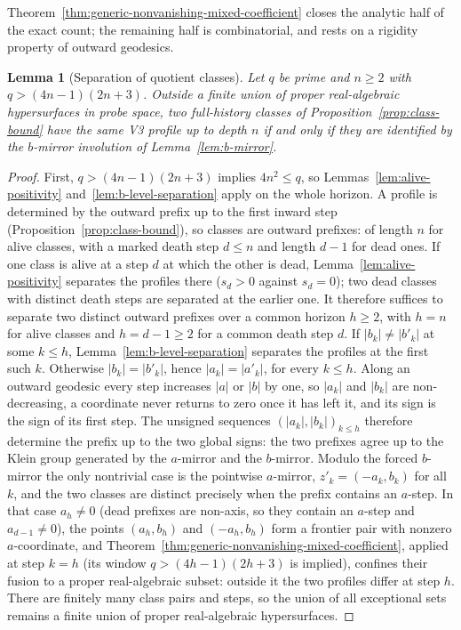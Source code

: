 \documentclass[11pt]{article}
\newtheorem{lemma}{Lemma}
\begin{document}
Theorem~\ref{thm:generic-nonvanishing-mixed-coefficient} closes the analytic half of the exact count; the
remaining half is combinatorial, and rests on a rigidity property of outward geodesics.

\begin{lemma}[Separation of quotient classes]
\label{lem:v3-quotient-class-separation}
Let $q$ be prime and $n\ge2$ with $q>(4n-1)(2n+3)$.
Outside a finite union of proper real-algebraic hypersurfaces in probe space, two full-history classes of
Proposition~\ref{prop:class-bound} have the same V3 profile up to depth $n$ if and only if they are
identified by the $b$-mirror involution of Lemma~\ref{lem:b-mirror}.
\end{lemma}

\begin{proof}
First, $q>(4n-1)(2n+3)$ implies $4n^2\le q$, so Lemmas~\ref{lem:alive-positivity}
and~\ref{lem:b-level-separation} apply on the whole horizon.
A profile is determined by the outward prefix up to the first inward step
(Proposition~\ref{prop:class-bound}), so classes are outward prefixes: of length $n$ for alive classes,
with a marked death step $d\le n$ and length $d-1$ for dead ones.
If one class is alive at a step $d$ at which the other is dead, Lemma~\ref{lem:alive-positivity} separates
the profiles there ($s_d>0$ against $s_d=0$); two dead classes with distinct death steps are separated at
the earlier one.
It therefore suffices to separate two distinct outward prefixes over a common horizon $h\ge2$, with $h=n$
for alive classes and $h=d-1\ge2$ for a common death step $d$.
If $|b_k|\neq|b'_k|$ at some $k\le h$, Lemma~\ref{lem:b-level-separation} separates the profiles at the
first such $k$.
Otherwise $|b_k|=|b'_k|$, hence $|a_k|=|a'_k|$, for every $k\le h$.
Along an outward geodesic every step increases $|a|$ or $|b|$ by one, so $|a_k|$ and $|b_k|$ are
non-decreasing, a coordinate never returns to zero once it has left it, and its sign is the sign of its
first step.
The unsigned sequences $(|a_k|,|b_k|)_{k\le h}$ therefore determine the prefix up to the two global signs:
the two prefixes agree up to the Klein group generated by the $a$-mirror and the $b$-mirror.
Modulo the forced $b$-mirror the only nontrivial case is the pointwise $a$-mirror, $z'_k=(-a_k,b_k)$ for
all $k$, and the two classes are distinct precisely when the prefix contains an $a$-step.
In that case $a_h\neq0$ (dead prefixes are non-axis, so they contain an $a$-step and $a_{d-1}\neq0$), the
points $(a_h,b_h)$ and $(-a_h,b_h)$ form a frontier pair with nonzero $a$-coordinate, and
Theorem~\ref{thm:generic-nonvanishing-mixed-coefficient}, applied at step $k=h$ (its window
$q>(4h-1)(2h+3)$ is implied), confines their fusion to a proper real-algebraic subset: outside it the two
profiles differ at step $h$.
There are finitely many class pairs and steps, so the union of all exceptional sets remains a finite union
of proper real-algebraic hypersurfaces.
\end{proof}
\end{document}
